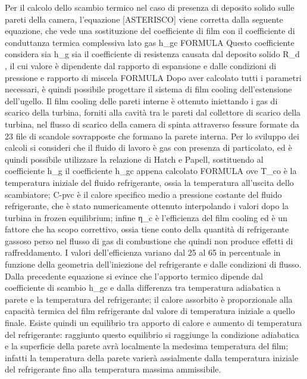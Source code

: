 Per il calcolo dello scambio termico nel caso di presenza di deposito solido sulle pareti della camera, l’equazione [ASTERISCO] viene corretta dalla seguente equazione, che vede una sostituzione del coefficiente di film con il coefficiente di conduttanza termica complessiva lato gas h_{gc} FORMULA
Questo coefficiente considera sia h_g sia il coefficiente di resistenza causata dal deposito solido R_d , il cui valore è dipendente dal rapporto di espansione e dalle condizioni di pressione e rapporto di miscela FORMULA
Dopo aver calcolato tutti i parametri necessari, è quindi possibile progettare il sistema di film cooling dell'estensione dell'ugello. Il film cooling delle pareti interne è ottenuto iniettando i gas di scarico della turbina, forniti alla cavità tra le pareti dal collettore di scarico della turbina, nel flusso di scarico della camera di spinta attraverso fessure formate da 23 file di scandole sovrapposte che formano la parete interna.
Per lo sviluppo dei calcoli si consideri che il fluido di lavoro è gas con presenza di particolato, ed è quindi possibile utilizzare la relazione di Hatch e Papell, sostituendo al coefficiente h_g il coefficiente h_{gc} appena calcolato FORMULA
ove T_{co} è la temperatura iniziale del fluido refrigerante, ossia la temperatura all'uscita dello scambiatore; C-{pvc} è il calore specifico medio a pressione costante del fluido refrigerante, che è stato numericamente ottenuto interpolando i valori dopo la turbina in frozen equilibrium; infine η_{c} è l'efficienza del film cooling ed è un fattore che ha scopo correttivo, ossia tiene conto della quantità di refrigerante gassoso perso nel flusso di gas di combustione che quindi non produce effetti di raffreddamento. I valori dell'efficienza variano dal 25 al 65 in percentuale in funzione della geometria dell'iniezione del refrigerante e dalle condizioni di flusso. 
Dalla precedente equazione si evince che l'apporto termico dipende dal coefficiente di scambio h_gc e dalla differenza tra temperatura adiabatica a parete e la temperatura del refrigerante; il calore assorbito è proporzionale alla capacità termica del film refrigerante dal valore di temperatura iniziale a quello finale. Esiste quindi un equilibrio tra apporto di calore e aumento di temperatura del refrigerante: raggiunto questo equilibrio si raggiunge la condizione adiabatica e la superficie della parete avrà localmente la medesima temperatura del film; infatti la temperatura della parete varierà assialmente dalla temperatura iniziale del refrigerante fino alla temperatura massima ammissibile.
